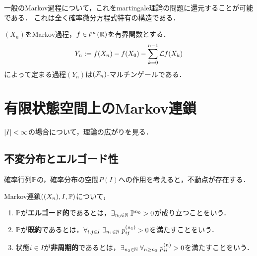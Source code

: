\documentclass[uplatex,dvipdfmx]{jsreport}
\begin{document}
\begin{tcolorbox}[colframe=ForestGreen, colback=ForestGreen!10!white,breakable,colbacktitle=ForestGreen!40!white,coltitle=black,fonttitle=\bfseries\sffamily,
title=]
    一般のMarkov過程について，これをmartingale理論の問題に還元することが可能である．
    これは全く確率微分方程式特有の構造である．
\end{tcolorbox}

\begin{theorem}
    $(X_n)$をMarkov過程，$f\in l^\infty(\mathbb{R})$を有界関数とする．
    \[Y_n:=f(X_n)-f(X_0)-\sum_{k=0}^{n-1}\mathcal{L} f(X_k)\]
    によって定まる過程$(Y_n)$は$(\mathcal{F}_n)$-マルチンゲールである．
\end{theorem}

\section{有限状態空間上のMarkov連鎖}

\begin{tcolorbox}[colframe=ForestGreen, colback=ForestGreen!10!white,breakable,colbacktitle=ForestGreen!40!white,coltitle=black,fonttitle=\bfseries\sffamily,
title=]
    $\lvert I\rvert<\infty$の場合について，理論の広がりを見る．
\end{tcolorbox}

\subsection{不変分布とエルゴード性}

\begin{tcolorbox}[colframe=ForestGreen, colback=ForestGreen!10!white,breakable,colbacktitle=ForestGreen!40!white,coltitle=black,fonttitle=\bfseries\sffamily,
title=]
    確率行列$\mathbb{P}$の，確率分布の空間$P(I)$への作用を考えると，不動点が存在する．
\end{tcolorbox}

\begin{definition}
    Markov連鎖$((X_n),I,\mathbb{P})$について，
    \begin{enumerate}
        \item $\mathbb{P}$が\textbf{エルゴード的}であるとは，$\exists_{n_0\in\mathbb{N}}\;\mathbb{P}^{n_0}>0$が成り立つことをいう．
        \item $\mathbb{P}$が\textbf{既約}であるとは，$\forall_{i,j\in I}\;\exists_{n_1\in\mathbb{N}}\;p_{ij}^{(n_1)}>0$を満たすことをいう．
        \item 状態$i\in I$が\textbf{非周期的}であるとは，$\exists_{n_2\in\mathbb{N}}\;\forall_{n\ge n_2}\;p_{ii}^{(n)}>0$を満たすことをいう．
    \end{enumerate}
\end{definition}
\end{document}
